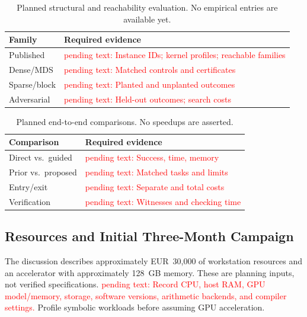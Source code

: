 \documentclass[conference]{IEEEtran}
\theoremstyle{definition}
\theoremstyle{plain}
\begin{document}
\begin{table}[t]
\centering
\caption{Planned structural and reachability evaluation. No empirical
entries are available yet.}
\label{tab:summary_all}
\small
\begin{tabularx}{\columnwidth}{@{}lX@{}}
\toprule
Family & Required evidence\\
\midrule
Published & \textcolor{red}{pending text: Instance IDs; kernel profiles;
reachable families}\\
Dense/MDS & \textcolor{red}{pending text: Matched controls and certificates}\\
Sparse/block & \textcolor{red}{pending text: Planted and unplanted outcomes}\\
Adversarial & \textcolor{red}{pending text: Held-out outcomes; search costs}\\
\bottomrule
\end{tabularx}
\end{table}
\begin{table}[t]
\centering
\caption{Planned end-to-end comparisons. No speedups are asserted.}
\small
\begin{tabularx}{\columnwidth}{@{}lX@{}}
\toprule
Comparison & Required evidence\\
\midrule
Direct vs.\ guided & \textcolor{red}{pending text: Success, time, memory}\\
Prior vs.\ proposed & \textcolor{red}{pending text: Matched tasks and limits}\\
Entry/exit & \textcolor{red}{pending text: Separate and total costs}\\
Verification & \textcolor{red}{pending text: Witnesses and checking time}\\
\bottomrule
\end{tabularx}
\end{table}

\subsection{Resources and Initial Three-Month Campaign}
The discussion describes approximately EUR~30,000 of workstation
resources and an accelerator with approximately 128~GB memory.
These are planning inputs, not verified specifications.
\textcolor{red}{pending text: Record CPU, host RAM, GPU model/memory,
storage, software versions, arithmetic backends, and compiler settings.}
Profile symbolic workloads before assuming GPU acceleration.
\end{document}
